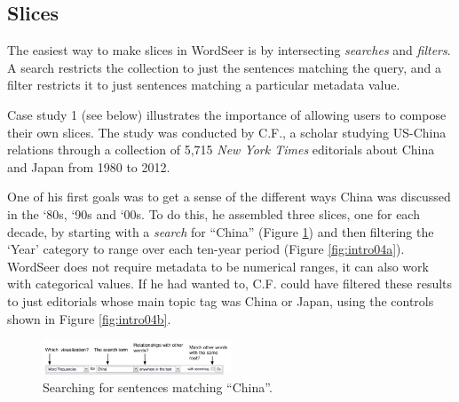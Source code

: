 \documentclass{sig-alternate}
\begin{document}
\subsection{Slices}

The easiest way to make slices in WordSeer is by intersecting \emph{searches} and \emph{filters}.  A search restricts the collection to just the sentences matching the query, and a filter restricts it to just sentences matching a particular metadata value. 

Case study 1 (see below) illustrates the importance of allowing users to compose their own slices. The study was conducted by  C.F.,  a scholar studying US-China relations through a collection of 5,715  \emph{New York Times} editorials about China and Japan from 1980 to 2012. 

One of his first goals was to get a sense of the different ways China was discussed in the `80s, `90s and `00s. To do this, he assembled three slices, one for each decade, by starting with a \emph{search} for ``China'' (Figure \ref{fig:intro03})  and then filtering the `Year' category to range over each ten-year period (Figure \ref{fig:intro04a}).  WordSeer does not require metadata to be numerical ranges, it can also work with categorical values. If he had wanted to, C.F. could have filtered these results to just editorials whose main topic tag was China or Japan, using the controls shown in Figure \ref{fig:intro04b}. 
\begin{figure}[ht!]
\begin{center}
	\includegraphics[width=0.5\textwidth]{fig/intro/03b.png}
\end{center}
    \caption{%
        Searching for sentences matching ``China''.\label{fig:intro03}
     }%
\end{figure}
\end{document}
